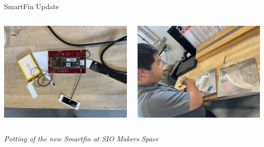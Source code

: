 
\begin{frame}{SmartFin Update}
    \begin{columns}
        \begin{column}{0.5\textwidth}
            \centering
            \includegraphics[width=\textwidth,keepaspectratio]{images/potting1.jpeg}
        \end{column}
        \begin{column}{0.5\textwidth}
            \centering
            \includegraphics[width=\textwidth,keepaspectratio]{images/potting2.jpeg}
        \end{column}
    \end{columns}
    \vspace{1em}
    \centering
    \textit{Potting of the new Smartfin at SIO Makers Space}
\end{frame}


